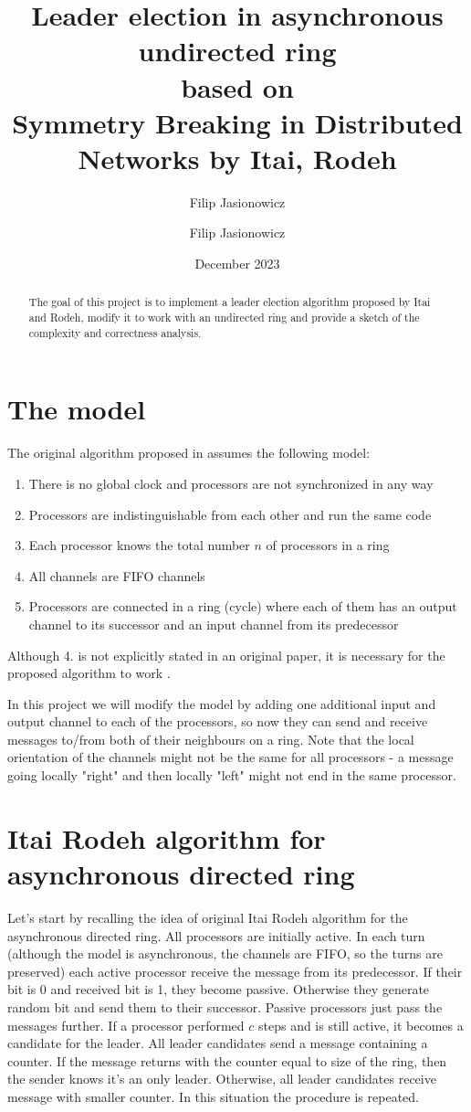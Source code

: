 \documentclass{article}
\title{%
  Leader election in asynchronous undirected ring \\
  \large based on \\ Symmetry Breaking in Distributed Networks by Itai, Rodeh}
\author{Filip Jasionowicz}
\author{Filip Jasionowicz}
\date{December 2023}
\begin{document}
\maketitle

\begin{abstract}
    The goal of this project is to implement a leader election algorithm proposed by Itai and Rodeh, modify it to work with an undirected ring and provide a sketch of the complexity and correctness analysis.
\end{abstract}

\section{The model}

The original algorithm proposed in \cite{ITAI199060} assumes the following model:
\begin{enumerate}
    \item There is no global clock and processors are not synchronized in any way
    \item Processors are indistinguishable from each other and run the same code
    \item Each processor knows the total number $n$ of processors in a ring
    \item All channels are FIFO channels 
    \item Processors are connected in a ring (cycle) where each of them has an output channel to its successor and an input channel from its predecessor
\end{enumerate}
Although 4. is not explicitly stated in an original paper, it is necessary for the proposed algorithm to work \cite{FOKKINK200553}.

In this project we will modify the model by adding one additional input and output channel to each of the processors, so now they can send and receive messages to/from both of their neighbours on a ring. Note that the local orientation of the channels might not be the same for all processors - a message going locally "right" and then locally "left" might not end in the same processor.

\section{Itai Rodeh algorithm for asynchronous directed ring}

Let's start by recalling the idea of original Itai Rodeh algorithm for the asynchronous directed ring. All processors are initially active. In each turn (although the model is asynchronous, the channels are FIFO, so the turns are preserved) each active processor receive the message from its predecessor. If their bit is 0 and received bit is 1, they become passive. Otherwise they generate random bit and send them to their successor. Passive processors just pass the messages further. If a processor performed $c$ steps and is still active, it becomes a candidate for the leader.
All leader candidates send a message containing a counter. If the message returns with the counter equal to size of the ring, then the sender knows it's an only leader. Otherwise, all leader candidates receive message with smaller counter. In this situation the procedure is repeated.
\end{document}
